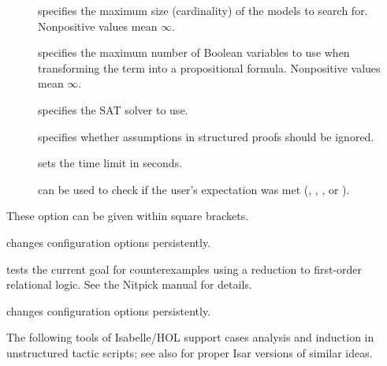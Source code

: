 \begin{isabellebody}
\begin{isamarkuptext}
\begin{description}
\begin{description}
    \item[] specifies the maximum size (cardinality) of the
      models to search for. Nonpositive values mean $\infty$.

    \item[] specifies the maximum number of Boolean variables
    to use when transforming the term into a propositional formula.
    Nonpositive values mean $\infty$.

    \item[] specifies the SAT solver to use.

    \item[] specifies whether assumptions in
    structured proofs should be ignored.

    \item[] sets the time limit in seconds.

    \item[] can be used to check if the user's
    expectation was met (, ,
    , or ).

    \end{description}

    These option can be given within square brackets.

  \item \hyperlink{command.HOL.refute-params}{\mbox{}} changes
    \hyperlink{command.HOL.refute}{\mbox{}} configuration options persistently.

  \item \hyperlink{command.HOL.nitpick}{\mbox{}} tests the current goal for counterexamples
    using a reduction to first-order relational logic. See the Nitpick manual
    \cite{isabelle-nitpick} for details.

  \item \hyperlink{command.HOL.nitpick-params}{\mbox{}} changes
    \hyperlink{command.HOL.nitpick}{\mbox{}} configuration options persistently.

  \end{description}%
\end{isamarkuptext}%
\isamarkuptrue%
%
\isamarkuptrue%
%
\begin{isamarkuptext}%
The following tools of Isabelle/HOL support cases analysis and
  induction in unstructured tactic scripts; see also
   for proper Isar versions of similar ideas.


\end{isamarkuptext}
\end{isabellebody}
